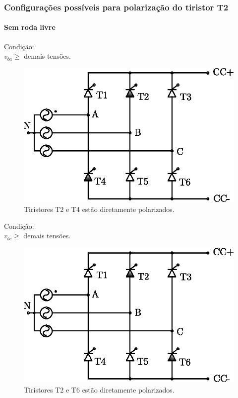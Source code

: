 \documentclass[aspectratio=43]{beamer}
\begin{document}
\begin{frame}
	\frametitle{Configurações possíveis para polarização do tiristor T2}
	\framesubtitle{Sem roda livre}
	
	\begin{minipage}{0.5\textwidth}\centering
		Condição:\\ $v_{ba} \ge $ demais tensões.
		\begin{figure}
			\centering
			\includegraphics[width=0.9\linewidth]{figuras/GraetzTiristorT2T4}
			\caption{Tiristores T2 e T4 estão diretamente polarizados.}
		\end{figure}	
	\end{minipage}%
	\begin{minipage}{0.5\textwidth}\centering
		Condição:\\ $v_{bc} \ge $ demais tensões.
		\begin{figure}
			\centering
			\includegraphics[width=0.9\linewidth]{figuras/GraetzTiristorT2T6}
			\caption{Tiristores T2 e T6 estão diretamente polarizados.}
		\end{figure}		
	\end{minipage}	
\end{frame}
\end{document}
